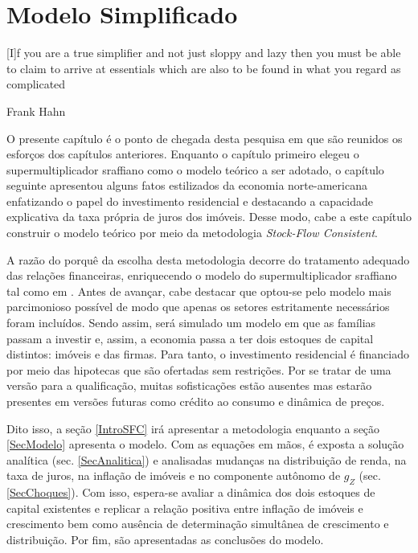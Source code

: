 
\chapter{Modelo Simplificado}\label{CapModelo}

\epigraph{[I]f you are a true simplifier and not just
sloppy and lazy then you must be able to claim to arrive at essentials which are also to be
found in what you regard as complicated}{Frank Hahn}

O presente capítulo é o ponto de chegada desta pesquisa em que são reunidos os esforços dos capítulos anteriores. Enquanto o capítulo primeiro elegeu o supermultiplicador sraffiano como o modelo teórico a ser adotado, o capítulo seguinte apresentou alguns fatos estilizados da economia norte-americana enfatizando o papel do investimento residencial e destacando a capacidade explicativa da taxa própria de juros dos imóveis. Desse modo, cabe a este capítulo construir o modelo teórico por meio da metodologia \textit{Stock-Flow Consistent}. 

A razão do porquê da escolha desta metodologia decorre do tratamento adequado das relações financeiras, enriquecendo o modelo do supermultiplicador sraffiano tal como em \textcite{brochier_supermultiplier_2018}. Antes de avançar, cabe destacar que optou-se pelo modelo mais parcimonioso possível de modo que apenas os setores estritamente necessários foram incluídos. Sendo assim, será simulado um modelo em que as famílias passam a investir e, assim, a economia passa a ter dois estoques de capital distintos: imóveis e das firmas. Para tanto, o investimento residencial é financiado por meio das hipotecas que são ofertadas sem restrições. Por se tratar de uma versão para a qualificação, muitas sofisticações estão ausentes mas estarão presentes em versões futuras como crédito ao consumo e dinâmica de preços.


Dito isso, a seção \ref{IntroSFC} irá apresentar a metodologia enquanto a seção \ref{SecModelo} apresenta o modelo. Com as equações em mãos, é exposta a solução analítica (sec. \ref{SecAnalitica}) e analisadas mudanças na distribuição de renda, na taxa de juros, na inflação de imóveis e no componente autônomo de $g_Z$ (sec. \ref{SecChoques}). Com isso, espera-se avaliar a dinâmica dos dois estoques de capital existentes e replicar a relação positiva entre inflação de imóveis e crescimento bem como ausência de determinação simultânea de crescimento e distribuição.
Por fim, são apresentadas as conclusões do modelo.







